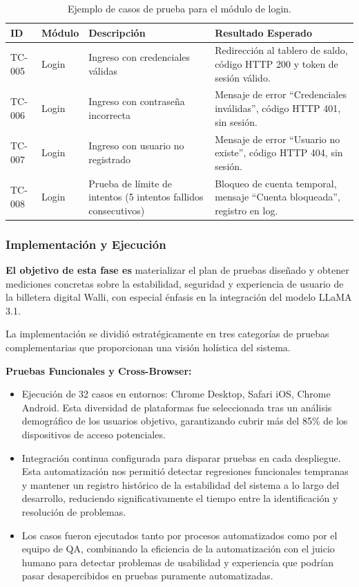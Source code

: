 \documentclass[12pt]{article}
\begin{document}
\begin{table}[h]
    \centering
    \begin{tabular}{llp{6cm}p{6cm}}
        \toprule
        \textbf{ID} & \textbf{Módulo} & \textbf{Descripción} & \textbf{Resultado Esperado} \\
        \midrule
        TC-005 & Login & Ingreso con credenciales válidas & Redirección al tablero de saldo, código HTTP 200 y token de sesión válido. \\
        TC-006 & Login & Ingreso con contraseña incorrecta & Mensaje de error ``Credenciales inválidas'', código HTTP 401, sin sesión. \\
        TC-007 & Login & Ingreso con usuario no registrado & Mensaje de error ``Usuario no existe'', código HTTP 404, sin sesión. \\
        TC-008 & Login & Prueba de límite de intentos (5 intentos fallidos consecutivos) & Bloqueo de cuenta temporal, mensaje ``Cuenta bloqueada'', registro en log. \\
        \bottomrule
    \end{tabular}
    \caption{Ejemplo de casos de prueba para el módulo de login.}
    \label{tab:casos_login}
\end{table}

\subsubsection{Implementación y Ejecución}

\textbf{El objetivo de esta fase es} materializar el plan de pruebas diseñado y obtener mediciones 
concretas sobre la estabilidad, seguridad y experiencia de usuario de la billetera digital Walli, 
con especial énfasis en la integración del modelo LLaMA 3.1. 

La implementación se dividió estratégicamente en tres categorías de pruebas complementarias 
que proporcionan una visión holística del sistema.

\textbf{Pruebas Funcionales y Cross-Browser:}
\begin{itemize}
    \item Ejecución de 32 casos en entornos: Chrome Desktop, Safari iOS, Chrome Android. Esta diversidad de plataformas fue seleccionada tras un análisis demográfico de los usuarios objetivo, garantizando cubrir más del 85\% de los dispositivos de acceso potenciales.
    \item Integración continua configurada para disparar pruebas en cada despliegue. Esta automatización nos permitió detectar regresiones funcionales tempranas y mantener un registro histórico de la estabilidad del sistema a lo largo del desarrollo, reduciendo significativamente el tiempo entre la identificación y resolución de problemas.
    \item Los casos fueron ejecutados tanto por procesos automatizados como por el equipo de QA, combinando la eficiencia de la automatización con el juicio humano para detectar problemas de usabilidad y experiencia que podrían pasar desapercibidos en pruebas puramente automatizadas.
\end{itemize}
\end{document}
